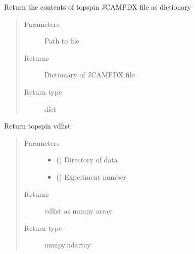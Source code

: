 \documentclass[letterpaper,10pt,english]{sphinxmanual}
\begin{document}
\begin{fulllineitems}
\label{\detokenize{dnpImport:dnpLab.dnpImport.topspin.topspin_jcamp_dx}}
Return the contents of topspin JCAMP\sphinxhyphen{}DX file as dictionary
\begin{quote}\begin{description}
\item[{Parameters}] \leavevmode
{} \sphinxhyphen{}\sphinxhyphen{} Path to file

\item[{Returns}] \leavevmode
Dictionary of JCAMP\sphinxhyphen{}DX file

\item[{Return type}] \leavevmode
dict

\end{description}\end{quote}

\end{fulllineitems}


\begin{fulllineitems}
\label{\detokenize{dnpImport:dnpLab.dnpImport.topspin.topspin_vdlist}}
Return topspin vdlist
\begin{quote}\begin{description}
\item[{Parameters}] \leavevmode\begin{itemize}
\item {} 
 () \sphinxhyphen{}\sphinxhyphen{} Directory of data

\item {} 
 () \sphinxhyphen{}\sphinxhyphen{} Experiment number

\end{itemize}

\item[{Returns}] \leavevmode
vdlist as numpy array

\item[{Return type}] \leavevmode
numpy.ndarray

\end{description}\end{quote}

\end{fulllineitems}
\end{document}

